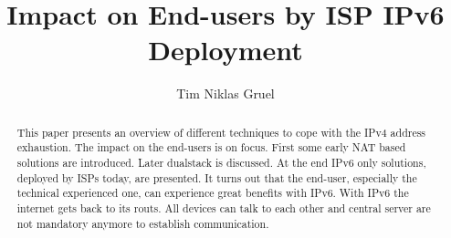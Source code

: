 \documentclass[format=sigconf, natbib=true, nonacm=true]{acmart}
\begin{document}
    \title{Impact on End-users by ISP IPv6 Deployment}

    \author{Tim Niklas Gruel}

    \begin{abstract}
        This paper presents an overview of different techniques to cope with the IPv4 address exhaustion. The impact on the end-users is on focus. First some early NAT based solutions are introduced. Later dualstack is discussed. At the end IPv6 only solutions, deployed by ISPs today, are presented. It turns out that the end-user, especially the technical experienced one, can experience great benefits with IPv6. With IPv6 the internet gets back to its routs. All devices can talk to each other and central server are not mandatory anymore to establish communication.
    \end{abstract}



    \maketitle
\end{document}
